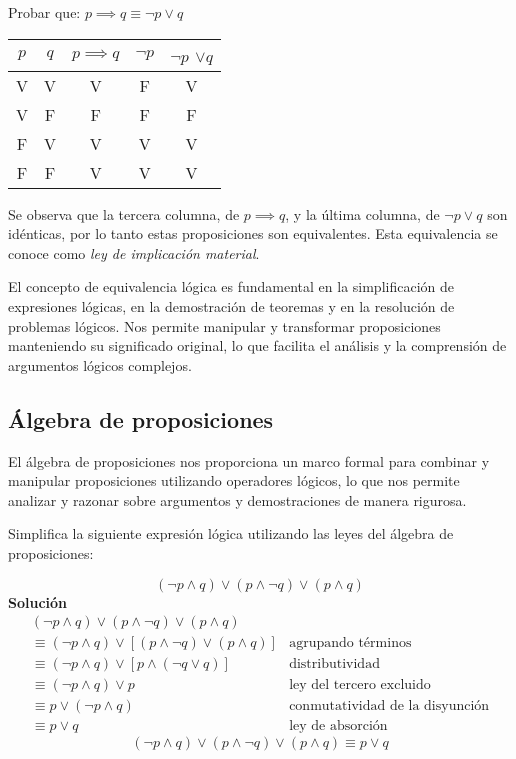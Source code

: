 \begin{fmd-example}
	Probar que: \( p \implies q \equiv \neg p \lor q \)

\begin{table}[H]
	\centering
	\begin{tabular}{|c|c|c|c|c|}
		\hline
		$p$ & $q$ & $p \implies q$ & $\neg p$ & $\neg p$ $\lor q$ \\
		\hline
		V & V & V & F & V \\
		V & F & F & F & F \\
		F & V & V & V & V \\
		F & F & V & V & V \\
		\hline
	\end{tabular}
\end{table}
	Se observa que la tercera columna, de $p \implies q$, y la última columna, de \( \neg p \lor q \) son idénticas, por lo tanto estas proposiciones son equivalentes. Esta equivalencia se conoce como \textit{ley de implicación material}.
	\label{ex:implicacion}
\end{fmd-example}

El concepto de equivalencia lógica es fundamental en la simplificación de expresiones lógicas, en la demostración de teoremas y en la resolución de problemas lógicos. Nos permite manipular y transformar proposiciones manteniendo su significado original, lo que facilita el análisis y la comprensión de argumentos lógicos complejos.

\subsection{Álgebra de proposiciones}
El álgebra de proposiciones nos proporciona un marco formal para combinar y manipular proposiciones utilizando operadores lógicos, lo que nos permite analizar y razonar sobre argumentos y demostraciones de manera rigurosa.

\begin{fmd-example}
	Simplifica la siguiente expresión lógica utilizando las leyes del álgebra de proposiciones:
	
	\[
	(\neg p \land q) \lor (p \land \neg q) \lor (p \land q)
	\]
	\textbf{Solución}
	\[ \begin{array}{ll}
		(\neg p \land q) \lor (p \land \neg q) \lor (p \land q) & \\
		\equiv (\neg p \land q) \lor [(p \land \neg q) \lor (p \land q)] & \mbox{agrupando términos}\\
		\equiv (\neg p \land q) \lor [p \land (\neg q \lor q)] & \mbox{distributividad}\\
		\equiv (\neg p \land q) \lor p & \mbox{ley del tercero excluido}\\
		\equiv p \lor (\neg p \land q) & \mbox{conmutatividad de la disyunción}\\
		\equiv p \lor q & \mbox{ley de absorción}
		\end{array} \]
\[ (\neg p \land q) \lor (p \land \neg q) \lor (p \land q) \equiv p \lor q \]
\end{fmd-example}

